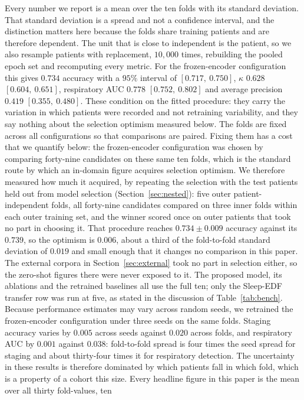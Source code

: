 \documentclass{ieeeaccess}
\newcommand{\fzAcc}{0.739}
\begin{document}
Every number we report is a mean over the ten folds with its standard deviation. That
standard deviation is a spread and not a confidence interval, and the distinction matters
here because the folds share training patients and are therefore dependent. The unit that
is close to independent is the patient, so we also resample patients with replacement,
$10{,}000$ times, rebuilding the pooled epoch set and recomputing every metric. For the
frozen-encoder configuration this gives $0.734$ accuracy with a $95\%$ interval of $[0.717,\ 0.750]$, $\kappa$ $0.628$
$[0.604,\ 0.651]$, respiratory AUC $0.778$ $[0.752,\ 0.802]$ and average precision $0.419$
$[0.355,\ 0.480]$. These condition on the fitted procedure: they carry the variation in
which patients were recorded and not retraining variability, and they say nothing about the
selection optimism measured below. The
folds are fixed across all configurations so that comparisons are paired. Fixing them has a
cost that we quantify below: the frozen-encoder configuration was chosen by comparing forty-nine
candidates on these same ten folds, which is the standard route by which an in-domain figure
acquires selection optimism. We therefore measured how much it acquired, by repeating the
selection with the test patients held out from model selection (Section~\ref{sec:nested}): five outer
patient-independent folds, all forty-nine candidates compared on three inner folds within
each outer training set, and the winner scored once on outer patients that took no part in
choosing it. That procedure
reaches $0.734 \pm 0.009$ accuracy against its $\fzAcc$, so the optimism is
$0.006$, about a third of the fold-to-fold standard deviation of
$0.019$ and small enough that it changes no comparison in this paper. The external corpora in
Section~\ref{sec:external} took no part in selection
either, so the zero-shot figures there were never exposed to it. The proposed
model, its ablations and the retrained baselines all use the full ten; only the Sleep-EDF
transfer row was run at five, as stated in the discussion of Table~\ref{tab:bench}. Because performance estimates may vary
across random seeds, we retrained the frozen-encoder configuration under three
seeds on the same folds. Staging accuracy varies by $0.005$ across seeds against
$0.020$ across folds, and respiratory AUC by $0.001$ against $0.038$: fold-to-fold spread
is four times the seed spread for staging and about thirty-four times it for respiratory detection.
The uncertainty in these results is therefore dominated by which patients fall in which
fold, which is a property of a cohort this size. Every headline figure in this paper is the mean over all thirty fold-values, ten
\end{document}
